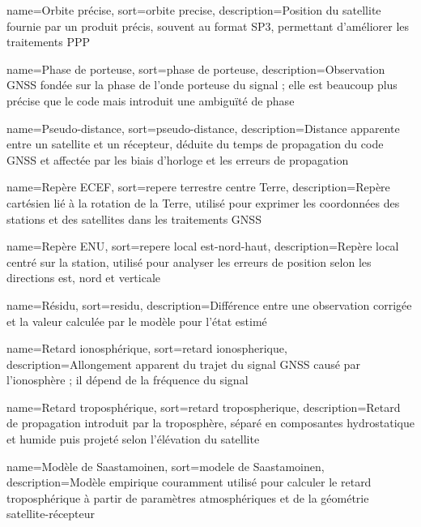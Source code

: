 {
    name={Orbite précise},
    sort={orbite precise},
    description={Position du satellite fournie par un produit précis, souvent au format SP3, permettant d'améliorer les traitements PPP}
}

{
    name={Phase de porteuse},
    sort={phase de porteuse},
    description={Observation GNSS fondée sur la phase de l'onde porteuse du signal ; elle est beaucoup plus précise que le code mais introduit une ambiguïté de phase}
}

{
    name={Pseudo-distance},
    sort={pseudo-distance},
    description={Distance apparente entre un satellite et un récepteur, déduite du temps de propagation du code GNSS et affectée par les biais d'horloge et les erreurs de propagation}
}

{
    name={Repère ECEF},
    sort={repere terrestre centre Terre},
    description={Repère cartésien lié à la rotation de la Terre, utilisé pour exprimer les coordonnées des stations et des satellites dans les traitements GNSS}
}

{
    name={Repère ENU},
    sort={repere local est-nord-haut},
    description={Repère local centré sur la station, utilisé pour analyser les erreurs de position selon les directions est, nord et verticale}
}

{
    name={Résidu},
    sort={residu},
    description={Différence entre une observation corrigée et la valeur calculée par le modèle pour l'état estimé}
}

{
    name={Retard ionosphérique},
    sort={retard ionospherique},
    description={Allongement apparent du trajet du signal GNSS causé par l'ionosphère ; il dépend de la fréquence du signal}
}

{
    name={Retard troposphérique},
    sort={retard tropospherique},
    description={Retard de propagation introduit par la troposphère, séparé en composantes hydrostatique et humide puis projeté selon l'élévation du satellite}
}

{
    name={Modèle de Saastamoinen},
    sort={modele de Saastamoinen},
    description={Modèle empirique couramment utilisé pour calculer le retard troposphérique à partir de paramètres atmosphériques et de la géométrie satellite-récepteur}
}

